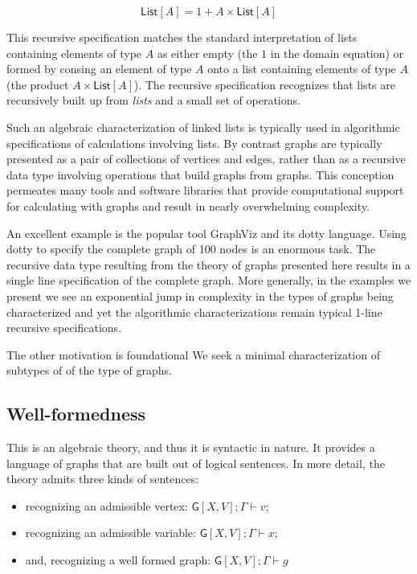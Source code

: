 \documentclass[12pt]{llncs}
\begin{document}
\[\mathsf{List}[A] = 1 + A \times \mathsf{List}[A]\]

This recursive specification matches the standard interpretation of
lists containing elements of type \(A\) as either empty (the \(1\) in
the domain equation) or formed by consing an element of type \(A\) onto
a list containing elements of type \(A\) (the product
\(A \times \mathsf{List}[A]\)). The recursive specification recognizes
that lists are recursively built up from \emph{lists} and a small set of
operations.

Such an algebraic characterization of linked lists is typically used in
algorithmic specifications of calculations involving lists. By contrast
graphs are typically presented as a pair of collections of vertices and
edges, rather than as a recursive data type involving operations that
build graphs from graphs. This conception permeates many tools and
software libraries that provide computational support for calculating
with graphs and result in nearly overwhelming complexity.

An excellent example is the popular tool GraphViz and its dotty
language. Using dotty to specify the complete graph of 100 nodes is an
enormous task. The recursive data type resulting from the theory of
graphs presented here results in a single line specification of the
complete graph. More generally, in the examples we present we see an
exponential jump in complexity in the types of graphs being
characterized and yet the algorithmic characterizations remain typical
1-line recursive specifications.

The other motivation is foundational We seek a minimal characterization
of subtypes of of the type of graphs.

\hypertarget{well-formedness}{%
\subsection{Well-formedness}\label{well-formedness}}

This is an algebraic theory, and thus it is syntactic in nature. It
provides a language of graphs that are built out of logical sentences.
In more detail, the theory admits three kinds of sentences:

\begin{itemize}
\item
  recognizing an admissible vertex:
  \(\mathsf{G}[X,V]; \Gamma \vdash v\);
\item
  recognizing an admissible variable:
  \(\mathsf{G}[X,V]; \Gamma \vdash x\);
\item
  and, recognizing a well formed graph:
  \(\mathsf{G}[X,V]; \Gamma \vdash g\)
\end{itemize}
\end{document}
